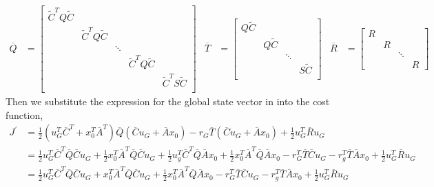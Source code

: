 \documentclass{article}
\newcommand{\doublebar}[1]{\overline{#1}}
\begin{document}
\begin{align}
    \doublebar{Q} &= \begin{bmatrix}
        \tilde{C}^TQ\tilde{C} &                       &        &                       &                       \\
                              & \tilde{C}^TQ\tilde{C} &        &                       &                       \\
                              &                       & \ddots &                       &                       \\
                              &                       &        & \tilde{C}^TQ\tilde{C} &                       \\
                              &                       &        &                       & \tilde{C}^TS\tilde{C} \\
    \end{bmatrix} &
    \doublebar{T} &= \begin{bmatrix}
        Q\tilde{C} &            &        &             \\
                   & Q\tilde{C} &        &             \\
                   &            & \ddots &             \\
                   &            &        & S\tilde{C}  \\
    \end{bmatrix} &
    \doublebar{R} &= \begin{bmatrix}
        R &   &        &   \\
          & R &        &   \\
          &   & \ddots &   \\
          &   &        & R
    \end{bmatrix}
\end{align}
Then we substitute the expression for the global state vector in  into the cost function,
\begin{align}
    J^\prime
    &= \tfrac{1}{2}\left(u_G^T\doublebar{C}^T + x_0^T\doublebar{A}^T\right)\doublebar{Q}
    \left(\doublebar{C}u_G + \doublebar{A}x_0\right)
    - r_G\doublebar{T}\left(\doublebar{C}u_G + \doublebar{A}x_0\right) + \frac{1}{2}u_G^T\doublebar{R}u_G \\
    &= \tfrac{1}{2}u_G^T\doublebar{C}^T\doublebar{Q}\doublebar{C}u_G
    + \tfrac{1}{2}x_0^T\doublebar{A}^T\doublebar{Q}\doublebar{C}u_G
    + \tfrac{1}{2}u_g^T\doublebar{C}^T\doublebar{Q}\doublebar{A}x_0
    + \tfrac{1}{2}x_0^T\doublebar{A}^T\doublebar{Q}\doublebar{A}x_0
    - r_G^T\doublebar{T}\doublebar{C}u_G
    - r_g^T\doublebar{T}\doublebar{A}x_0
    + \frac{1}{2}u_G^T\doublebar{R}u_G \\
    &= \tfrac{1}{2}u_G^T\doublebar{C}^T\doublebar{Q}\doublebar{C}u_G
    + x_0^T\doublebar{A}^T\doublebar{Q}\doublebar{C}u_G
    + \tfrac{1}{2}x_0^T\doublebar{A}^T\doublebar{Q}\doublebar{A}x_0
    - r_G^T\doublebar{T}\doublebar{C}u_G
    - r_g^T\doublebar{T}\doublebar{A}x_0
    + \frac{1}{2}u_G^T\doublebar{R}u_G
\end{align}
\end{document}
